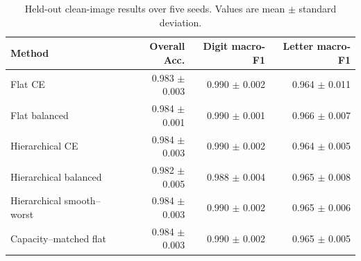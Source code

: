 \begin{table}[t]
\centering
\caption{Held-out clean-image results over five seeds. Values are mean $\pm$ standard deviation.}
\label{tab:real_results}
\begin{tabular}{lrrr}
\toprule
Method & Overall Acc. & Digit macro-F1 & Letter macro-F1 \\
\midrule
Flat CE & 0.983 $\pm$ 0.003 & 0.990 $\pm$ 0.002 & 0.964 $\pm$ 0.011 \\
Flat balanced & 0.984 $\pm$ 0.001 & 0.990 $\pm$ 0.001 & 0.966 $\pm$ 0.007 \\
Hierarchical CE & 0.984 $\pm$ 0.003 & 0.990 $\pm$ 0.002 & 0.964 $\pm$ 0.005 \\
Hierarchical balanced & 0.982 $\pm$ 0.005 & 0.988 $\pm$ 0.004 & 0.965 $\pm$ 0.008 \\
Hierarchical smooth--worst & 0.984 $\pm$ 0.003 & 0.990 $\pm$ 0.002 & 0.965 $\pm$ 0.006 \\
Capacity--matched flat & 0.984 $\pm$ 0.003 & 0.990 $\pm$ 0.002 & 0.965 $\pm$ 0.005 \\
\bottomrule
\end{tabular}
\end{table}
